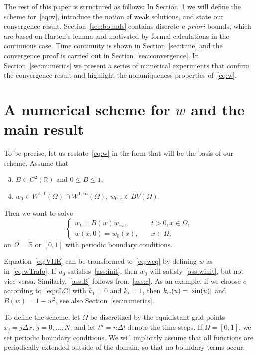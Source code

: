 \documentclass[11pt,leqno]{amsart}
\newcommand{\R}{\mathbb{R}}
\newcommand{\pt}[1]{#1_t}
\newcommand{\pxx}[1]{#1_{xx}}
\newenvironment{Assumptions}%
{%
\renewcommand{\theenumi}{(\textbf{H}.\textbf{\arabic{enumi}})}
\renewcommand{\labelenumi}{\theenumi}
\begin{enumerate}}%
{\end{enumerate}}
\DeclarePairedDelimiter\abs{\lvert}{\rvert}
\begin{document}
The rest of this paper is structured as follows: In Section~\ref{sec:definitions} we will define the scheme for~\eqref{eq:w}, introduce the notion of weak solutions, and state our convergence result. Section~\ref{sec:bounds} contains discrete \emph{a priori} bounds, which are based on Harten's lemma and motivated by formal calculations in the continuous case. Time continuity is shown in Section~\ref{sec:time} and the convergence proof is carried out in Section~\ref{sec:convergence}. In Section~\ref{sec:numerics} we present a series of numerical experiments that confirm the convergence result and highlight the nonuniqueness properties of~\eqref{eq:w}. 

\section{A numerical scheme for $w$ and the main result}\label{sec:definitions}
To be precise, let us restate~\eqref{eq:w} in the form that will be the basis of our scheme. 
Assume that
\begin{Assumptions}\setcounter{enumi}{2}
\item  \label{ass:B} $B\in C^2(\R)$ and $0\le B\le 1$,
\item \label{ass:winit} $w_0\in W^{1,1}(\Omega)\cap W^{1,\infty}(\Omega)$, $w_{0,x}\in BV(\Omega)$.
\end{Assumptions}
Then we want to solve
\begin{equation}\label{eq:weq}
\begin{cases}
  \pt{w}=B(w) \pxx{w}, &\quad t>0, x\in \Omega,\\
w(x,0)=w_0(x),&\quad x \in \Omega,
\end{cases}
\end{equation}
on $\Omega=\R$ or $[0,1]$ with periodic boundary conditions.

Equation~\eqref{eq:VHE} can be transformed to~\eqref{eq:weq} by defining $w$ as in~\eqref{eq:wTrafo}. If $u_0$ satisfies~\ref{ass:init}, then $w_0$ will satisfy~\ref{ass:winit}, but not vice versa. Similarly,~\ref{ass:B} follows from~\ref{ass:c}. As an example, if we choose $c$ according to~\eqref{eq:cLC} with $k_1=0$ and $k_2=1$, then  $k_w(u)=\abs{\sin(u)}$ and $B(w)=1-w^2$, see also Section~\ref{sec:numerics}. 

To define the scheme, let $\Omega$ be discretized by the equidistant grid points $x_j=j\Delta x$, $j=0,\dots, N$, and let $t^n= n\Delta t$ denote the time steps. If $\Omega=[0,1]$, we set periodic boundary conditions. We will implicitly assume that all functions are periodically extended outside of the domain, so that no boundary terms occur. 
\end{document}

